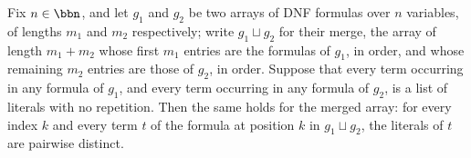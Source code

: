 \begin{lemma}
\label{LMN.mergeGates_nodup}
\leanok
{}
Fix $n \in \bbn$, and let $g_1$ and $g_2$ be two arrays of DNF formulas over $n$
variables, of lengths $m_1$ and $m_2$ respectively; write $g_1 \sqcup g_2$ for their
merge, the array of length $m_1+m_2$ whose first $m_1$ entries are the formulas of
$g_1$, in order, and whose remaining $m_2$ entries are those of $g_2$, in order. Suppose
that every term occurring in any formula of $g_1$, and every term occurring in any
formula of $g_2$, is a list of literals with no repetition. Then the same holds for the
merged array: for every index $k$ and every term $t$ of the formula at position $k$ in
$g_1 \sqcup g_2$, the literals of $t$ are pairwise distinct.
\end{lemma}
